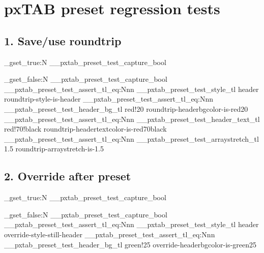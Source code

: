 \documentclass{article}
\begin{document}
\section*{pxTAB preset regression tests}

\subsection*{1. Save/use roundtrip}


\ExplSyntaxOn
\bool_gset_true:N \g__pxtab_preset_test_capture_bool
\ExplSyntaxOff


\ExplSyntaxOn
\bool_gset_false:N \g__pxtab_preset_test_capture_bool
\__pxtab_preset_test_assert_tl_eq:Nnn
  \g__pxtab_preset_test_style_tl { header }
  { roundtrip-style-is-header }
\__pxtab_preset_test_assert_tl_eq:Nnn
  \g__pxtab_preset_test_header_bg_tl { red!20 }
  { roundtrip-headerbgcolor-is-red20 }
\__pxtab_preset_test_assert_tl_eq:Nnn
  \g__pxtab_preset_test_header_text_tl { red!70!black }
  { roundtrip-headertextcolor-is-red70black }
\__pxtab_preset_test_assert_tl_eq:Nnn
  \g__pxtab_preset_test_arraystretch_tl { 1.5 }
  { roundtrip-arraystretch-is-1.5 }
\ExplSyntaxOff

\subsection*{2. Override after preset}

\ExplSyntaxOn
\bool_gset_true:N \g__pxtab_preset_test_capture_bool
\ExplSyntaxOff


\ExplSyntaxOn
\bool_gset_false:N \g__pxtab_preset_test_capture_bool
\__pxtab_preset_test_assert_tl_eq:Nnn
  \g__pxtab_preset_test_style_tl { header }
  { override-style-still-header }
\__pxtab_preset_test_assert_tl_eq:Nnn
  \g__pxtab_preset_test_header_bg_tl { green!25 }
  { override-headerbgcolor-is-green25 }
\ExplSyntaxOff
\end{document}
